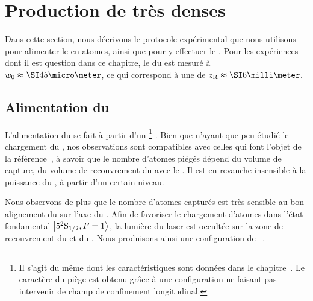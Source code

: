 \section{Production de \nats très denses}
Dans cette section, nous décrivons le protocole expérimental que nous utilisons pour alimenter le \pd en atomes, ainsi que pour y effectuer le \rpef.
Pour les expériences dont il est question dans ce chapitre, le \waist du \fld est mesuré à $\wzero\approx\micron{45}$, ce qui correspond à une \ldr de $\zR\approx\mm{6}$. 

\subsection{Alimentation du \pd}\label{sec:ChargementPD}

L'alimentation du \pd se fait à partir d'un \pmobd%
\footnote{Il s'agit du même \pmo dont les caractéristiques sont données dans le chapitre~. Le caractère \bd du piège est obtenu grâce à une configuration ne faisant pas intervenir de champ de confinement longitudinal.}%
.
Bien que n'ayant que peu étudié le chargement du \pd, nos observations sont compatibles avec celles qui font l'objet de la référence~\cite{ATS05}, à savoir que le nombre d'atomes piégés dépend du volume de capture, \cad du volume de recouvrement du \fl avec le \pmo.
Il est en revanche insensible à la puissance du \ldp, à partir d'un certain niveau.
%	

\noindent Nous observons de plus que le nombre d'atomes capturés est très sensible au bon alignement du \flp sur l'axe du \pmo. 
Afin de favoriser le chargement d'atomes dans l'état fondamental ${{\left| {{5^2 {\rm S}_{{1}/{2}}}, F=1 } \right\rangle}}$, la lumière du laser  est occultée sur la zone de recouvrement du \fld et du \pmo. Nous produisons ainsi une configuration de ~\cite{KDJ93}. 


\casse


